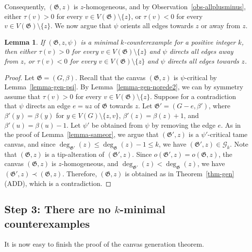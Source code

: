 \documentclass{article}
\newcommand{\GG}{\mathcal{G}}
\newcommand\g{\mathfrak{G}}
\newtheorem{lemma}[theorem]{Lemma}
\begin{document}
Consequently, $(\g,z)$ is $z$-homogeneous, and by Observation~\ref{obs-allplusminus},
either $\tau(v)>0$ for every $v\in V(\g)\setminus\{z\}$, or $\tau(v)<0$ for every $v\in V(\g)\setminus\{z\}$. We  now argue that $\psi$ orients all edges towards $z$ or away from $z$.

\begin{lemma}\label{lemma-gen-norede1}
If $(\g,z,\psi)$ is a minimal $k$-counterexample for a positive integer $k$, then
either $\tau(v)>0$ for every $v\in V(\g)\setminus\{z\}$ and $\psi$ directs all edges away from $z$,
or $\tau(v)<0$ for every $v\in V(\g)\setminus\{z\}$ and $\psi$ directs all edges towards $z$.
\end{lemma}
\begin{proof}
Let $\g=(G,\beta)$.  Recall that the canvas $(\g,z)$ is $\psi$-critical by Lemma~\ref{lemma-gen-psi}.
By Lemma~\ref{lemma-gen-norede2}, we can by symmetry assume that $\tau(v)>0$ for every $v\in V(\g)\setminus\{z\}$.
Suppose for a contradiction that $\psi$ directs an edge $e=uz$ of $\g$ towards $z$.
Let $\g'=(G-e,\beta')$, where $\beta'(y)=\beta(y)$ for $y\in V(G)\setminus\{z,v\}$, $\beta'(z)=\beta(z)+1$, and $\beta'(u)=\beta(u)-1$.
Let $\psi'$ be obtained from $\psi$ by removing the edge $e$. As in the proof of Lemma~\ref{lemma-sameor}, we argue that $(\g',z)$ is a $\psi'$-critical tame canvas, and since $\deg_{\g'}(z)\le \deg_{\g}(z)-1\le k$, we have $(\g',z)\in \GG_k$.
Note that $(\g,z)$ is a tip-alteration of $(\g',z)$.
Since $o(\g',z)=o(\g,z)$, the canvas $(\g,z)$ is $z$-homogeneous, and $\deg_{\g'}(z)<\deg_{\g}(z)$,
we have $(\g',z)\prec (\g,z)$.  Therefore, $(\g,z)$ is obtained as in Theorem~\ref{thm-gen} (ADD), which is a contradiction.
\end{proof}
\subsection{Step 3: There are no $k$-minimal counterexamples}\label{subsec:finish}
It is now easy to finish the proof of the canvas generation theorem.
\end{document}
